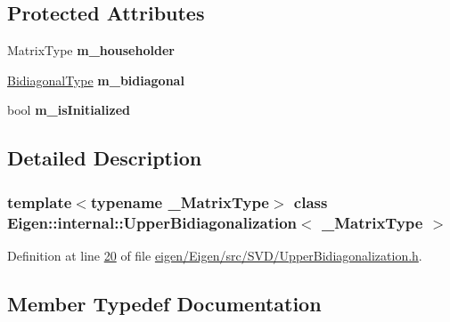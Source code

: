 \subsection*{Protected Attributes}
\begin{DoxyCompactItemize}
\item 
\mbox{\label{class_eigen_1_1internal_1_1_upper_bidiagonalization_a40d8ad9af770d519cf1f0c09db49817a}} 
Matrix\+Type {\bfseries m\+\_\+householder}
\item 
\mbox{\label{class_eigen_1_1internal_1_1_upper_bidiagonalization_ac9fe2868fd468ff98dad66127ae7a7c2}} 
\hyperlink{group___core___module}{Bidiagonal\+Type} {\bfseries m\+\_\+bidiagonal}
\item 
\mbox{\label{class_eigen_1_1internal_1_1_upper_bidiagonalization_ade33f99ca536721cf4ed69fe68f6dc95}} 
bool {\bfseries m\+\_\+is\+Initialized}
\end{DoxyCompactItemize}


\subsection{Detailed Description}
\subsubsection*{template$<$typename \+\_\+\+Matrix\+Type$>$\newline
class Eigen\+::internal\+::\+Upper\+Bidiagonalization$<$ \+\_\+\+Matrix\+Type $>$}



Definition at line \hyperlink{eigen_2_eigen_2src_2_s_v_d_2_upper_bidiagonalization_8h_source_l00020}{20} of file \hyperlink{eigen_2_eigen_2src_2_s_v_d_2_upper_bidiagonalization_8h_source}{eigen/\+Eigen/src/\+S\+V\+D/\+Upper\+Bidiagonalization.\+h}.



\subsection{Member Typedef Documentation}
\mbox{\label{class_eigen_1_1internal_1_1_upper_bidiagonalization_adcb14f3919a3dcc9977ba6b8105087fe}} 
